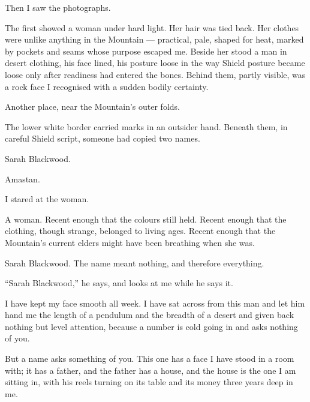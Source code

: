 \ornament

Then I saw the photographs.\par

The first showed a woman under hard light. Her hair was tied back. Her clothes were unlike anything in the Mountain --- practical, pale, shaped for heat, marked by pockets and seams whose purpose escaped me. Beside her stood a man in desert clothing, his face lined, his posture loose in the way Shield posture became loose only after readiness had entered the bones. Behind them, partly visible, was a rock face I recognised with a sudden bodily certainty.\par

Another place, near the Mountain's outer folds.\par

The lower white border carried marks in an outsider hand. Beneath them, in careful Shield script, someone had copied two names.\par

Sarah Blackwood.\par

Amastan.\par

I stared at the woman.\par

A woman. Recent enough that the colours still held. Recent enough that the clothing, though strange, belonged to living ages. Recent enough that the Mountain's current elders might have been breathing when she was.\par

Sarah Blackwood. The name meant nothing, and therefore everything.\par

\ornament

``Sarah Blackwood,'' he says, and looks at me while he says it.\par

I have kept my face smooth all week. I have sat across from this man and let him hand me the length of a pendulum and the breadth of a desert and given back nothing but level attention, because a number is cold going in and asks nothing of you.\par

But a name asks something of you. This one has a face I have stood in a room with; it has a father, and the father has a house, and the house is the one I am sitting in, with his reels turning on its table and its money three years deep in me.\par

